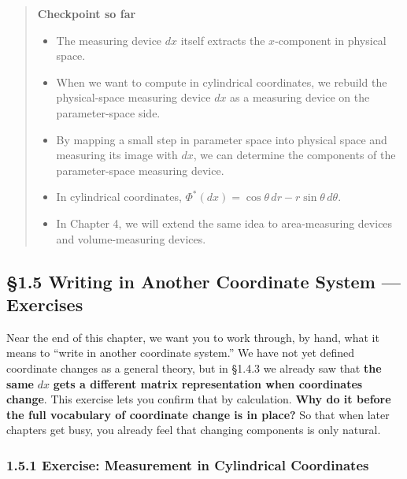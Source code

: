 \documentclass[a4paper,12pt,openany]{book}
\begin{document}
\begin{quote}
\textbf{Checkpoint so far}

\begin{itemize}
\item
  The measuring device \(dx\) itself extracts the \(x\)-component in
  physical space.
\item
  When we want to compute in cylindrical coordinates, we rebuild the
  physical-space measuring device \(dx\) as a measuring device on the
  parameter-space side.
\item
  By mapping a small step in parameter space into physical space and
  measuring its image with \(dx\), we can determine the components of
  the parameter-space measuring device.
\item
  In cylindrical coordinates,
  \(\Phi^*(dx)=\cos\theta\,dr-r\sin\theta\,d\theta\).
\item
  In Chapter 4, we will extend the same idea to area-measuring devices
  and volume-measuring devices.
\end{itemize}
\end{quote}

\par\vspace{0.35em}\par

\hypertarget{writing-in-another-coordinate-system-exercises}{%
\subsection{§1.5 Writing in Another Coordinate System —
Exercises}\label{writing-in-another-coordinate-system-exercises}}

Near the end of this chapter, we want you to work through, by hand, what
it means to ``write in another coordinate system.'' We have not yet
defined coordinate changes as a general theory, but in §1.4.3 we already
saw that \textbf{the same} \(dx\) \textbf{gets a different matrix
representation when coordinates change}. This exercise lets you confirm
that by calculation. \textbf{Why do it before the full vocabulary of
coordinate change is in place?} So that when later chapters get busy,
you already feel that changing components is only natural.

\hypertarget{exercise-measurement-in-cylindrical-coordinates}{%
\subsubsection{1.5.1 Exercise: Measurement in Cylindrical
Coordinates}\label{exercise-measurement-in-cylindrical-coordinates}}
\end{document}
